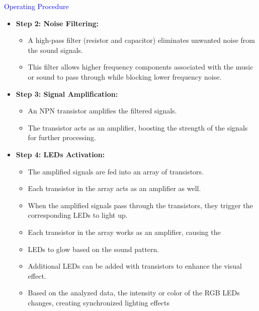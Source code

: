 \documentclass[final]{beamer}
\newlength{\onecolwid}
\begin{document}
\begin{frame}[t]
\begin{columns}[t]
\begin{column}{\onecolwid}
\begin{block}{\textcolor{blue}{Operating Procedure}}
\begin{itemize}
\begin{itemize}
\item \textbf{how Mic convert sound signal into voltage levels?}
\begin{itemize}
  \item The microphone consists of a diaphragm and a transducer.
\item Sound waves cause the diaphragm to vibrate, changing the
capacitance of the transducer.
\item The changing capacitance generates an electrical signal that
represents the sound.
\item The electrical signal from the microphone is in the form of
varying voltage levels corresponding to the sound waves.
\end{itemize}

\end{itemize}

\item \textbf{Step 2: Noise Filtering:}
\begin{itemize}
  \item A high-pass filter (resistor and capacitor) eliminates unwanted noise from the sound signals.
  \item This filter allows higher frequency components associated with
the music or sound to pass through while blocking lower frequency noise.

\end{itemize}
\item \textbf{Step 3: Signal Amplification:}
\begin{itemize}
  \item An NPN transistor amplifies the filtered signals.
  \item The transistor acts as an amplifier, boosting the strength of
the signals for further processing.
\end{itemize}
\item \textbf{Step 4: LEDs Activation:}
\begin{itemize}
  \item The amplified signals are fed into an array of transistors.
 \item Each transistor in the array acts as an amplifier as well.
 \item When the amplified signals pass through the transistors, they
trigger the corresponding LEDs to light up.
 \item Each transistor in the array works as an amplifier, causing the
 \item LEDs to glow based on the sound pattern.
 \item Additional LEDs can be added with transistors to enhance the
visual effect.
 \item Based on the analyzed data, the intensity or color of the RGB
LEDs changes, creating synchronized lighting effects
\end{itemize}
\end{itemize}


\end{block}
\end{column}
\end{columns}
\end{frame}
\end{document}
